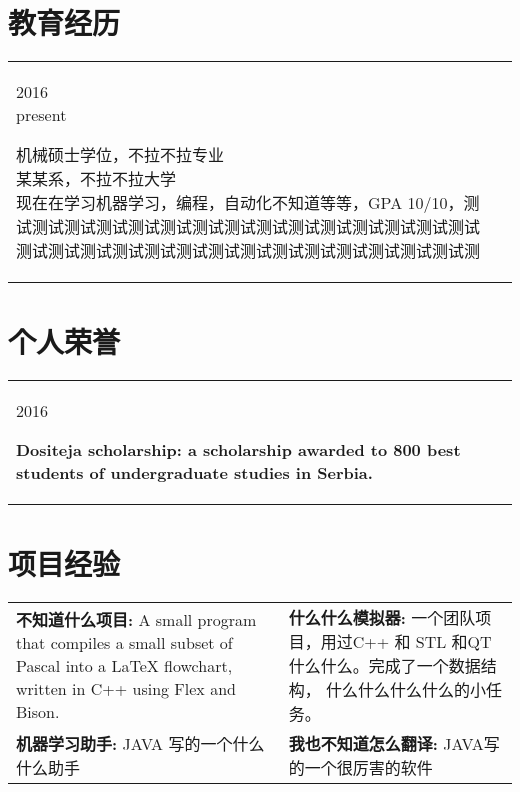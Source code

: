 \documentclass[a4paper]{article}
\makeatletter
\newenvironment{entrylist}{%
	\begin{tabular*}{\textwidth}{@{\extracolsep{\fill}}ll}
	}{%
	\end{tabular*}
}
\newcommand{\entry}[4]{%
	\parbox[t]{2cm}{ #1}\parbox[t]{12.8cm}{%
		\hfill #2\\%
		\hspace*{\fill}%
		{\footnotesize\color{workplace}#3 }\\%
		\vspace{1pt} #4%
	}\\}
\newenvironment{aplist}{%
	\begin{tabular*}{\textwidth}{@{\extracolsep{\fill}}ll}
	}{%
	\end{tabular*}
}
\newcommand{\apentry}[2]{%
	\parbox[t]{2cm}{ #1}\parbox[t]{12.8cm}{%
		\textbf{\color{black} #2\\}%
	}\\}
\makeatother
\begin{document}
\section{教育经历}
\begin{entrylist}
	\entry
	{2016~\textemdash \\present}
	{机械硕士学位，不拉不拉专业}
	{某某系，不拉不拉大学}
	{现在在学习机器学习，编程，自动化不知道等等，GPA 10/10，测试测试测试测试测试测试测试测试测试测试测试测试测试测试测试测试测试测试测试测试测试测试测试测试测试测试测试测试测试测}
	\entry
	{2012~\textemdash \\2016}
	{Bachelor's Degree in Computer Science}
	{Faculty of Mathematics, University of Belgrade}
	{Passed many courses that covered important topics such as algorithms, object oriented programming, Unix system programming, etc. Graduated as one of the best students in the generation. GPA 9.61 out of 10.}
	\entry
	{2008~\textemdash \\2012}
	{High School}
	{Grammar School, Valjevo}
	{Finished with several awards for good students. Was a member of the school choir and took part in various music manifestations.}
\end{entrylist}

\section{个人荣誉}
\begin{aplist}
	\apentry{2016}{Dositeja scholarship: a scholarship awarded to 800 best students of undergraduate studies in Serbia.}
	\apentry{10/2016}{Brand New Engineers Hackathon, team Schwifty, 3rd place.}
\end{aplist}

\section{项目经验}
\setlength{\tabcolsep}{6pt}
\begin{tabularx}{1.07\textwidth}{XX}
	\textbf{不知道什么项目:} A small program that compiles a small subset of Pascal into a LaTeX flowchart, written in C++ using Flex and Bison. &
	\textbf{什么什么模拟器:} 一个团队项目，用过C++ 和
	STL 和QT 什么什么。完成了一个数据结构，
	什么什么什么什么的小任务。 \\
	\textbf{机器学习助手:} JAVA 写的一个什么什么助手 &
	\textbf{我也不知道怎么翻译:} JAVA写的一个很厉害的软件 \\
\end{tabularx}
~
\end{document}

